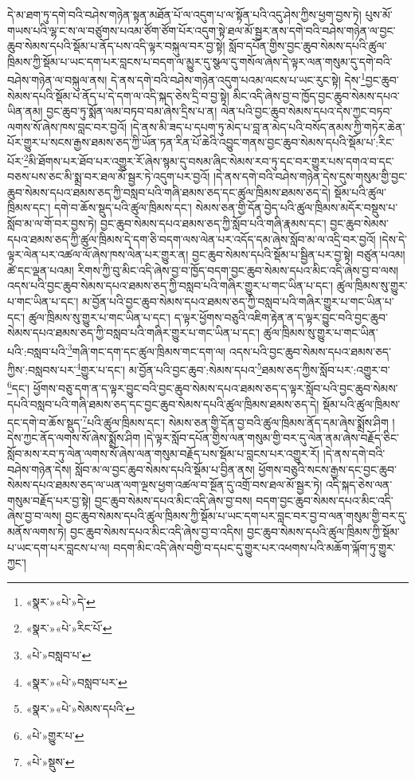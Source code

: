 དེ་མ་ཐག་ཏུ་དགེ་བའི་བཤེས་གཉེན་སྟན་མཐོན་པོ་ལ་འདུག་པ་ལ་སྟོན་པའི་འདུ་ཤེས་ཀྱིས་ཕྱག་བྱས་ཏེ། པུས་མོ་གཡས་པའི་ལྷ་ང་ས་ལ་བཙུགས་པའམ་ཙོག་ཙོག་པོར་འདུག་སྟེ་ཐལ་མོ་སྦྱར་ནས་དགེ་བའི་བཤེས་གཉེན་ལ་བྱང་ཆུབ་སེམས་དཔའི་སྡོམ་པ་ནོད་པས་འདི་ལྟར་བསྐུལ་བར་བྱ་སྟེ། སློབ་དཔོན་གྱིས་བྱང་ཆུབ་སེམས་དཔའི་ཚུལ་ཁྲིམས་ཀྱི་སྡོམ་པ་ཡང་དག་པར་བླངས་པ་བདག་ལ་མྱུར་དུ་སྩལ་དུ་གསོལ་ཞེས་དེ་ལྟར་ལན་གསུམ་དུ་དགེ་བའི་བཤེས་གཉེན་ལ་བསྐུལ་ནས། དེ་ནས་དགེ་བའི་བཤེས་གཉེན་འདུག་པའམ་ལངས་པ་ཡང་རུང་སྟེ། དེས་\footnote{«སྣར་»«པེ་»དེ་}བྱང་ཆུབ་སེམས་དཔའི་སྡོམ་པ་ནོད་པ་དེ་དག་ལ་འདི་སྐད་ཅེས་དྲི་བ་བྱ་སྟེ། མིང་འདི་ཞེས་བྱ་བ་ཁྱོད་བྱང་ཆུབ་སེམས་དཔའ་ཡིན་ནམ། བྱང་ཆུབ་ཏུ་སྨོན་ལམ་བཏབ་བམ་ཞེས་དྲིས་པ་ན། ལེན་པའི་བྱང་ཆུབ་སེམས་དཔའ་དེས་ཀྱང་བཏབ་ལགས་སོ་ཞེས་ཁས་བླང་བར་བྱའོ། །དེ་ནས་མི་ཟད་པ་དཔག་ཏུ་མེད་པ་བླ་ན་མེད་པའི་བསོད་ནམས་ཀྱི་གཏེར་ཆེན་པོར་གྱུར་པ་སངས་རྒྱས་ཐམས་ཅད་ཀྱི་ཡོན་ཏན་རིན་པོ་ཆེའི་འབྱུང་གནས་བྱང་ཆུབ་སེམས་དཔའི་སྡོམ་པ་:རིང་པོར་\footnote{«སྣར་»«པེ་»རིང་པོ་}མི་ཐོགས་པར་ཐོབ་པར་འགྱུར་རོ་ཞེས་སྙམ་དུ་བསམ་ཞིང་སེམས་རབ་ཏུ་དང་བར་གྱུར་པས་དགའ་བ་དང་བཅས་པས་ཅང་མི་སྨྲ་བར་ཐལ་མོ་སྦྱར་ཏེ་འདུག་པར་བྱའོ། །དེ་ནས་དགེ་བའི་བཤེས་གཉེན་དེས་དུས་གསུམ་གྱི་བྱང་ཆུབ་སེམས་དཔའ་ཐམས་ཅད་ཀྱི་བསླབ་པའི་གཞི་ཐམས་ཅད་དང་ཚུལ་ཁྲིམས་ཐམས་ཅད་དེ། སྡོམ་པའི་ཚུལ་ཁྲིམས་དང་། དགེ་བ་ཆོས་སྡུད་པའི་ཚུལ་ཁྲིམས་དང་། སེམས་ཅན་གྱི་དོན་བྱེད་པའི་ཚུལ་ཁྲིམས་མདོར་བསྡུས་པ་སློབ་མ་ལ་གོ་བར་བྱས་ཏེ། བྱང་ཆུབ་སེམས་དཔའ་ཐམས་ཅད་ཀྱི་སློབ་པའི་གཞི་རྣམས་དང་། བྱང་ཆུབ་སེམས་དཔའ་ཐམས་ཅད་ཀྱི་ཚུལ་ཁྲིམས་དེ་དག་ཅི་བདག་ལས་ལེན་པར་འདོད་དམ་ཞེས་སློབ་མ་ལ་འདྲི་བར་བྱའོ། །དེས་དེ་ལྟར་ལེན་པར་འཚལ་ལོ་ཞེས་ཁས་ལེན་པར་གྱུར་ན། བྱང་ཆུབ་སེམས་དཔའི་སྡོམ་པ་སྦྱིན་པར་བྱ་སྟེ། བཙུན་པའམ། ཚེ་དང་ལྡན་པའམ། རིགས་ཀྱི་བུ་མིང་འདི་ཞེས་བྱ་བ་ཁྱོད་བདག་བྱང་ཆུབ་སེམས་དཔའ་མིང་འདི་ཞེས་བྱ་བ་ལས། འདས་པའི་བྱང་ཆུབ་སེམས་དཔའ་ཐམས་ཅད་ཀྱི་བསླབ་པའི་གཞིར་གྱུར་པ་གང་ཡིན་པ་དང་། ཚུལ་ཁྲིམས་སུ་གྱུར་པ་གང་ཡིན་པ་དང་། མ་བྱོན་པའི་བྱང་ཆུབ་སེམས་དཔའ་ཐམས་ཅད་ཀྱི་བསླབ་པའི་གཞིར་གྱུར་པ་གང་ཡིན་པ་དང་། ཚུལ་ཁྲིམས་སུ་གྱུར་པ་གང་ཡིན་པ་དང་། ད་ལྟར་ཕྱོགས་བཅུའི་འཇིག་རྟེན་ན་ད་ལྟར་བྱུང་བའི་བྱང་ཆུབ་སེམས་དཔའ་ཐམས་ཅད་ཀྱི་བསླབ་པའི་གཞིར་གྱུར་པ་གང་ཡིན་པ་དང་། ཚུལ་ཁྲིམས་སུ་གྱུར་པ་གང་ཡིན་པའི་:བསླབ་པའི་\footnote{«པེ་»བསླབ་པ་}གཞི་གང་དག་དང་ཚུལ་ཁྲིམས་གང་དག་ལ། འདས་པའི་བྱང་ཆུབ་སེམས་དཔའ་ཐམས་ཅད་ཀྱིས་:བསླབས་པར་\footnote{«སྣར་»«པེ་»བསླབ་པར་}གྱུར་པ་དང་། མ་བྱོན་པའི་བྱང་ཆུབ་:སེམས་དཔའ་\footnote{«སྣར་»«པེ་»སེམས་དཔའི་}ཐམས་ཅད་ཀྱིས་སློབ་པར་:འགྱུར་བ་\footnote{«པེ་»གྱུར་པ་}དང་། ཕྱོགས་བཅུ་དག་ན་ད་ལྟར་བྱུང་བའི་བྱང་ཆུབ་སེམས་དཔའ་ཐམས་ཅད་ད་ལྟར་སློབ་པའི་བྱང་ཆུབ་སེམས་དཔའི་བསླབ་པའི་གཞི་ཐམས་ཅད་དང་བྱང་ཆུབ་སེམས་དཔའི་ཚུལ་ཁྲིམས་ཐམས་ཅད་དེ། སྡོམ་པའི་ཚུལ་ཁྲིམས་དང་དགེ་བ་ཆོས་སྡུད་\footnote{«པེ་»སྡུས་}པའི་ཚུལ་ཁྲིམས་དང་། སེམས་ཅན་གྱི་དོན་བྱ་བའི་ཚུལ་ཁྲིམས་ནོད་དམ་ཞེས་སྨྲོས་ཤིག །དེས་ཀྱང་ནོད་ལགས་སོ་ཞེས་སྨྲོས་ཤིག །དེ་ལྟར་སློབ་དཔོན་གྱིས་ལན་གསུམ་གྱི་བར་དུ་ལེན་ནམ་ཞེས་བརྗོད་ཅིང་སློབ་མས་རབ་ཏུ་ལེན་ལགས་སོ་ཞེས་ལན་གསུམ་བརྗོད་པས་སྡོམ་པ་བླངས་པར་འགྱུར་རོ། །དེ་ནས་དགེ་བའི་བཤེས་གཉེན་དེས། སློབ་མ་ལ་བྱང་ཆུབ་སེམས་དཔའི་སྡོམ་པ་བྱིན་ནས། ཕྱོགས་བཅུའི་སངས་རྒྱས་དང་བྱང་ཆུབ་སེམས་དཔའ་ཐམས་ཅད་ལ་ཡན་ལག་ལྔས་ཕྱག་འཚལ་བ་སྔོན་དུ་འགྲོ་བས་ཐལ་མོ་སྦྱར་ཏེ། འདི་སྐད་ཅེས་ལན་གསུམ་བརྗོད་པར་བྱ་སྟེ། བྱང་ཆུབ་སེམས་དཔའ་མིང་འདི་ཞེས་བྱ་བས། བདག་བྱང་ཆུབ་སེམས་དཔའ་མིང་འདི་ཞེས་བྱ་བ་ལས། བྱང་ཆུབ་སེམས་དཔའི་ཚུལ་ཁྲིམས་ཀྱི་སྡོམ་པ་ཡང་དག་པར་བླང་བར་བྱ་བ་ལན་གསུམ་གྱི་བར་དུ་མནོས་ལགས་ཏེ། བྱང་ཆུབ་སེམས་དཔའ་མིང་འདི་ཞེས་བྱ་བ་འདིས། བྱང་ཆུབ་སེམས་དཔའི་ཚུལ་ཁྲིམས་ཀྱི་སྡོམ་པ་ཡང་དག་པར་བླངས་པ་ལ། བདག་མིང་འདི་ཞེས་བགྱི་བ་དཔང་དུ་གྱུར་པར་འཕགས་པའི་མཆོག་ལྐོག་ཏུ་གྱུར་ཀྱང་། 
